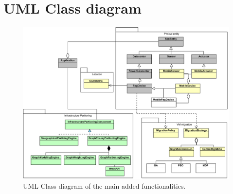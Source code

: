 \chapter{UML Class diagram}

\begin{figure} [h]
	\centering
	\includegraphics[width=\textwidth]{images/sw_architecture/sw_architecture}
	\caption{UML Class diagram of the main added functionalities.}
	\label{sw_architecture}
\end{figure}
